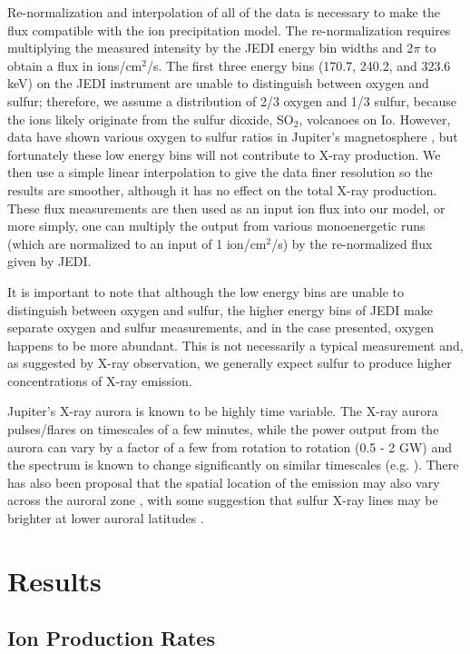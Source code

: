 \documentclass[draft]{agujournal2018}
\begin{document}
Re-normalization and interpolation of all of the data is necessary to make the flux compatible with the ion precipitation model.
The re-normalization requires multiplying the measured intensity by the JEDI energy bin widths \citep{mauk2017ssr} and 2$\pi$ to obtain a flux in ions/cm$^2$/s.
The first three energy bins (170.7, 240.2, and 323.6 keV) on the JEDI instrument are unable to distinguish between oxygen and sulfur; therefore, we assume a distribution of 2/3 oxygen and 1/3 sulfur, because the ions likely originate from the sulfur dioxide, SO$_2$, volcanoes on Io.
However, data have shown various oxygen to sulfur ratios in Jupiter's magnetosphere \citep{delamere2005,dougherty2017,kim2019}, but fortunately these low energy bins will not contribute to X-ray production.
We then use a simple linear interpolation to give the data finer resolution so the results are smoother, although it has no effect on the total X-ray production.
These flux measurements are then used as an input ion flux into our model, or more simply, one can multiply the output from various monoenergetic runs (which are normalized to an input of 1 ion/cm$^2$/s) by the re-normalized flux given by JEDI.

It is important to note that although the low energy bins are unable to distinguish between oxygen and sulfur, the higher energy bins of JEDI make separate oxygen and sulfur measurements, and in the case presented, oxygen happens to be more abundant.
This is not necessarily a typical measurement and, as suggested by X-ray observation, we generally expect sulfur to produce higher concentrations of X-ray emission. 

Jupiter's X-ray aurora is known to be highly time variable.
The X-ray aurora pulses/flares on timescales of a few minutes, while the power output from the aurora can vary by a factor of a few from rotation to rotation (0.5 - 2 GW) and the spectrum is known to change significantly on similar timescales (e.g. \citet{branduardi2007,elsner2005,hui2010}).
There has also been proposal that the spatial location of the emission may also vary across the auroral zone \citep{dunn2017,gladstone2002,jackman2018}, with some suggestion that sulfur X-ray lines may be brighter at lower auroral latitudes \citep{dunn2016}.

\section{Results}

\subsection{Ion Production Rates}
\end{document}
